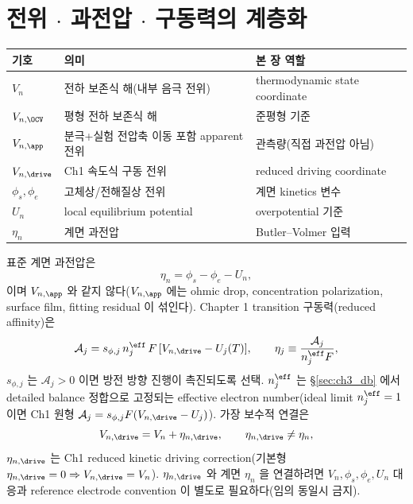 \section{전위 $\cdot$ 과전압 $\cdot$ 구동력의 계층화}\label{sec:ch3_potentials}
\begin{longtable}{p{} p{} p{}}
\toprule 기호 & 의미 & 본 장 역할 \\ \midrule \endhead
$V_n$ & 전하 보존식 해(내부 음극 전위) & thermodynamic state coordinate \\
$V_{n,\OCV}$ & 평형 전하 보존식 해 & 준평형 기준 \\
$V_{n,\app}$ & 분극+실험 전압축 이동 포함 apparent 전위 & 관측량(직접 과전압 아님) \\
$V_{n,\drive}$ & Ch1 속도식 구동 전위 & reduced driving coordinate \\
$\phi_s,\phi_e$ & 고체상/전해질상 전위 & 계면 kinetics 변수 \\
$U_n$ & local equilibrium potential & overpotential 기준 \\
$\eta_n$ & 계면 과전압 & Butler--Volmer 입력 \\
\bottomrule
\end{longtable}
표준 계면 과전압은
\begin{equation}
\eta_n=\phi_s-\phi_e-U_n,
\label{eq:ch3_eta_standard}
\end{equation}
이며 $V_{n,\app}$ 와 같지 않다($V_{n,\app}$ 에는 ohmic drop, concentration polarization, surface film,
fitting residual 이 섞인다). Chapter 1 transition 구동력(reduced affinity)은
\begin{equation}
\mathcal A_j=s_{\phi,j}\,n_j^{\eff}\,F\,[V_{n,\drive}-U_j(T)],\qquad \eta_j\equiv\frac{\mathcal A_j}{n_j^{\eff}F},
\label{eq:ch3_Aj}
\end{equation}
$s_{\phi,j}$ 는 $\mathcal A_j>0$ 이면 방전 방향 진행이 촉진되도록 선택. $n_j^{\eff}$ 는 \S\ref{sec:ch3_db}
에서 detailed balance 정합으로 고정되는 effective electron number(ideal limit $n_j^{\eff}=1$ 이면 Ch1
원형 $\mathcal A_j=s_{\phi,j}F(V_{n,\drive}-U_j)$). 가장 보수적 연결은
\begin{equation}
V_{n,\drive}=V_n+\eta_{n,\drive},\qquad \eta_{n,\drive}\ne\eta_n,
\label{eq:ch3_drive}
\end{equation}
$\eta_{n,\drive}$ 는 Ch1 reduced kinetic driving correction(기본형 $\eta_{n,\drive}=0\Rightarrow V_{n,\drive}=V_n$).
$\eta_{n,\drive}$ 와 계면 $\eta_n$ 을 연결하려면 $V_n,\phi_s,\phi_e,U_n$ 대응과 reference electrode
convention 이 별도로 필요하다(임의 동일시 금지).

